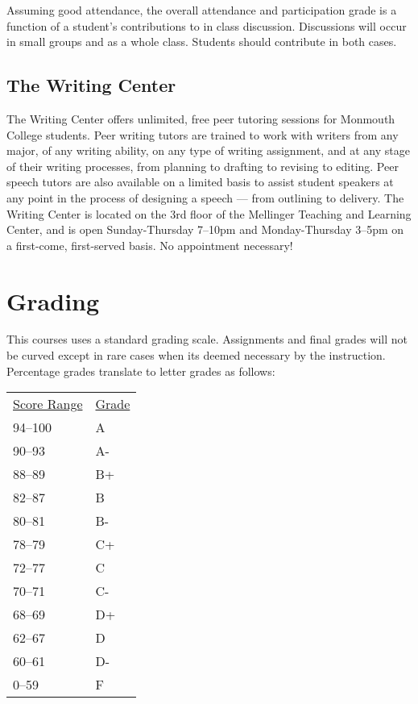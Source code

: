 \documentclass[nobib]{tufte-handout}
\begin{document}
Assuming good attendance, the overall attendance and participation grade is a function of a student's contributions to in class discussion.  Discussions will occur in small groups and as a whole class. Students should contribute in both cases.


\subsection{The Writing Center}

The Writing Center offers unlimited, free peer tutoring sessions for Monmouth College students.  Peer writing tutors are trained to work with writers from any major, of any writing ability, on any type of writing assignment, and at any stage of their writing processes, from planning to drafting to revising to editing.  Peer speech tutors are also available on a limited basis to assist student speakers at any point in the process of designing a speech --- from outlining to delivery.  The Writing Center is  located on the 3rd floor of the Mellinger Teaching and Learning Center, and is open Sunday-Thursday 7--10pm and Monday-Thursday 3--5pm on a first-come, first-served basis.  No appointment necessary!

\section{Grading}

This courses uses a standard grading scale.  Assignments and final grades will not be curved except in rare cases when its deemed necessary by the instruction.  Percentage grades translate to letter grades as follows:
\newline
\begin{center}
\begin{small}
\begin{tabular}{ll}
\underline{Score Range} & \underline{Grade} \\
94--100 & A \\
90--93 & A- \\
88--89 & B+ \\
82--87 & B \\
80--81 & B- \\
78--79 & C+ \\
72--77 & C \\
70--71 & C- \\
68--69 & D+ \\
62--67 & D \\
60--61 & D- \\
0--59 & F
\end{tabular}
\end{small}
\end{center}
\end{document}

